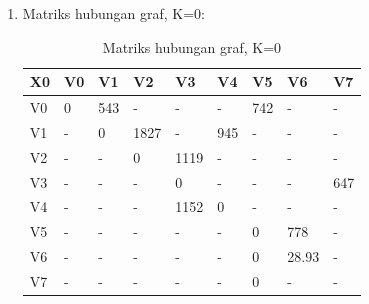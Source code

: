\begin{enumerate}
\begin{enumerate}
    \begin{enumerate}
    \item Matriks hubungan graf, K=0:            \begin{table}[!htbp]
    \centering
    \caption{Matriks hubungan graf, K=0}
    \label{table52}
    \begin{tabular}{|l|l|l|l|l|l|l|l|l|}                \hline
         X0 & V0 & V1 & V2 & V3 & V4 & V5 & V6 & V7 \\
    \hline
         V0 & 0 & 543 & - & - & - & 742 & - & - \\
    \hline
          V1 & - & 0 & 1827 & - & 945 & - & - & - \\
    \hline
         V2 & - & - & 0 & 1119 & - & - & - & - \\
    \hline
         V3 & - & - & - & 0 & - & - & - & 647 \\
    \hline
         V4 & - & - & - & 1152 & 0 & - & - & - \\
    \hline
        V5 & - & - & - & - & - & 0 & 778 & - \\
    \hline
        V6 & - & - & - & - & - & 0 & 28.93 & - \\
    \hline
        V7 & - & - & - & - & - & 0 & - & - \\
    \hline
    \end{tabular}
    \end{table}



\end{enumerate}
\end{enumerate}
\end{enumerate}
